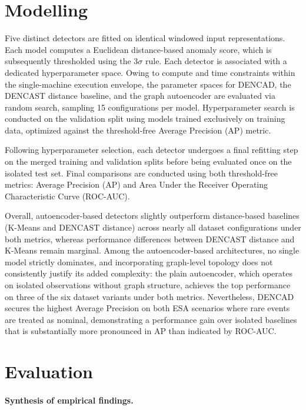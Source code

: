 \documentclass{article}
\begin{document}
\section{Modelling}

Five distinct detectors are fitted on identical windowed input representations. 
Each model computes a Euclidean distance-based anomaly score, 
which is subsequently thresholded using the $3\sigma$ rule. 
Each detector is associated with a dedicated hyperparameter space.
Owing to compute and time constraints within the single-machine execution envelope, 
the parameter spaces for DENCAD, the DENCAST distance baseline, and the graph autoencoder are evaluated via random search, 
sampling 15 configurations per model. 
Hyperparameter search is conducted on the validation split using models trained exclusively on training data, 
optimized against the threshold-free Average Precision (AP) metric.

Following hyperparameter selection, 
each detector undergoes a final refitting step on the merged training and validation splits 
before being evaluated once on the isolated test set. 
Final comparisons are conducted using both threshold-free metrics: Average Precision (AP) and Area Under the Receiver Operating Characteristic Curve (ROC-AUC). 

Overall, autoencoder-based detectors slightly outperform distance-based baselines 
(K-Means and DENCAST distance) across nearly all dataset configurations under both metrics, 
whereas performance differences between DENCAST distance and K-Means remain marginal. 
Among the autoencoder-based architectures, no single model strictly dominates, 
and incorporating graph-level topology does not consistently justify its added complexity:
the plain autoencoder, which operates on isolated observations without graph structure, 
achieves the top performance on three of the six dataset variants under both metrics. 
Nevertheless, DENCAD secures the highest Average Precision on both ESA scenarios where rare events are treated as nominal,
demonstrating a performance gain over isolated baselines that is substantially more pronounced in AP than indicated by ROC-AUC.

\section{Evaluation}
\label{sec:eval}

\paragraph{Synthesis of empirical findings.}
\end{document}
